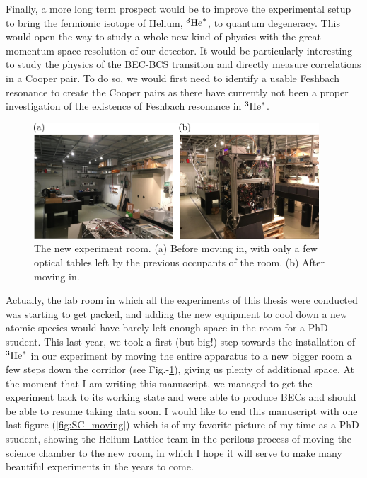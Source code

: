 Finally, a more long term prospect would be to improve the experimental setup to bring the fermionic isotope of Helium, $^3\mathrm{He}^*$, to quantum degeneracy. This would open the way to study a whole new kind of physics with the great momentum space resolution of our detector. It would be particularly interesting to study the physics of the BEC-BCS transition and directly measure \kmk correlations in a Cooper pair. To do so, we would first need to identify a usable Feshbach resonance to create the Cooper pairs as there have currently not been a proper investigation of the existence of Feshbach resonance in $^3\mathrm{He}^*$. 

\renewcommand{\thefigure}{1}
\begin{figure}[h!]
    \centering
    \includegraphics[width=0.95\textwidth]{Fig/Conclusion/before_after.png}
    \caption[The new experiment room]{The new experiment room. (a) Before moving in, with only a few optical tables left by the previous occupants of the room. (b) After moving in.}
    \label{fig:before_after}
\end{figure}

Actually, the lab room in which all the experiments of this thesis were conducted was starting to get packed, and adding the new equipment to cool down a new atomic species would have barely left enough space in the room for a PhD student. This last year, we took a first (but big!) step towards the installation of $^3\mathrm{He}^*$ in our experiment by moving the entire apparatus to a new bigger room a few steps down the corridor (see Fig.-\ref{fig:before_after}), giving us plenty of additional space. At the moment that I am writing this manuscript, we managed to get the experiment back to its working state and were able to produce BECs and should be able to resume taking data soon. I would like to end this manuscript with one last figure (\ref{fig:SC_moving}) which is of my favorite picture of my time as a PhD student, showing the Helium Lattice team in the perilous process of moving the science chamber to the new room, in which I hope it will serve to make many beautiful experiments in the years to come.



